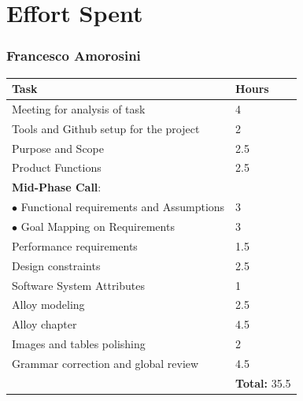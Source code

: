 \documentclass{report}
\begin{document}
\chapter{Effort Spent}
\subsection*{Francesco Amorosini}
\begin{table}[!ht]
	\begin{tabular}{|C{.60\textwidth}||C{.20\textwidth}|}
		\toprule
		\textbf{Task} & \textbf{Hours}\\
		\midrule
		\midrule
		Meeting for analysis of task & 4\\
		\midrule
		Tools and Github setup for the project & 2\\
		\midrule
		Purpose and Scope & 2.5\\
		\midrule
		Product Functions& 2.5\\ 
		\midrule
		\small{\textbf{Mid-Phase Call}}: & \\
		\vspace{.2mm}
		$\bullet$ Functional requirements and Assumptions & \vspace{.2mm} 3\\
		$\bullet$ Goal Mapping on Requirements & 3\\
		\midrule
		Performance requirements & 1.5\\
		\midrule
		Design constraints & 2.5\\
		\midrule
		Software System Attributes & 1\\
		\midrule
		Alloy modeling & 2.5\\
		\midrule
		Alloy chapter & 4.5\\
		\midrule
		Images and tables polishing & 2\\
		\midrule
		Grammar correction and global review & 4.5\\
		\midrule
		& \textbf{Total:} 35.5\\
		\bottomrule
	\end{tabular}
\end{table}
\end{document}
